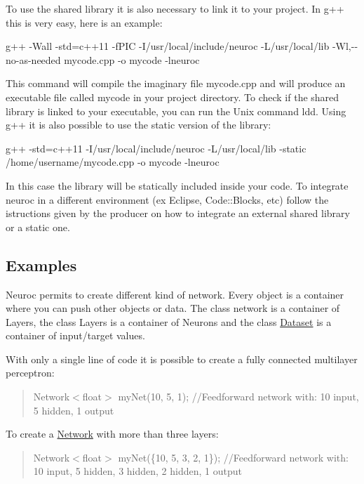 To use the shared library it is also necessary to link it to your project. In g++ this is very easy, here is an example\-:

{\ttfamily g++ -\/\-Wall -\/std=c++11 -\/f\-P\-I\-C -\/\-I/usr/local/include/neuroc -\/\-L/usr/local/lib -\/\-Wl,-\/-\/no-\/as-\/needed mycode.\-cpp -\/o mycode -\/lneuroc}

This command will compile the imaginary file mycode.\-cpp and will produce an executable file called mycode in your project directory. To check if the shared library is linked to your executable, you can run the Unix command ldd. Using g++ it is also possible to use the static version of the library\-:

{\ttfamily g++ -\/std=c++11 -\/\-I/usr/local/include/neuroc -\/\-L/usr/local/lib -\/static /home/username/mycode.cpp -\/o mycode -\/lneuroc}

In this case the library will be statically included inside your code. To integrate neuroc in a different environment (ex Eclipse, Code\-::\-Blocks, etc) follow the istructions given by the producer on how to integrate an external shared library or a static one.

\subsection*{Examples }

Neuroc permits to create different kind of network. Every object is a container where you can push other objects or data. The class network is a container of Layers, the class Layers is a container of Neurons and the class \hyperlink{class_dataset}{Dataset} is a container of input/target values.

With only a single line of code it is possible to create a fully connected multilayer perceptron\-:

\begin{quotation}
Network$<$float$>$ my\-Net(10, 5, 1); //\-Feedforward network with\-: 10 input, 5 hidden, 1 output

\end{quotation}


To create a \hyperlink{class_network}{Network} with more than three layers\-:

\begin{quotation}
Network$<$float$>$ my\-Net(\{10, 5, 3, 2, 1\}); //\-Feedforward network with\-: 10 input, 5 hidden, 3 hidden, 2 hidden, 1 output

\end{quotation}


